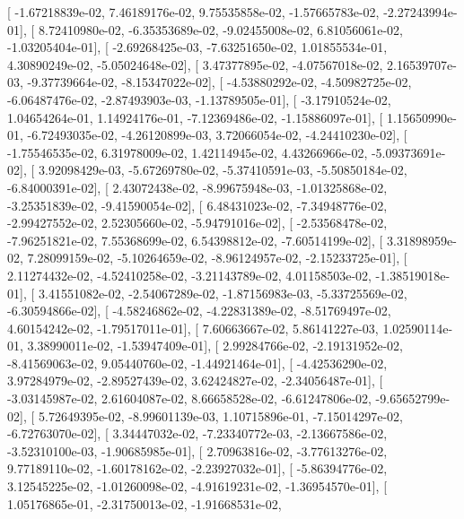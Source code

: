 \documentclass{article}
\begin{document}
       [ -1.67218839e-02,   7.46189176e-02,   9.75535858e-02,
         -1.57665783e-02,  -2.27243994e-01],
       [  8.72410980e-02,  -6.35353689e-02,  -9.02455008e-02,
          6.81056061e-02,  -1.03205404e-01],
       [ -2.69268425e-03,  -7.63251650e-02,   1.01855534e-01,
          4.30890249e-02,  -5.05024648e-02],
       [  3.47377895e-02,  -4.07567018e-02,   2.16539707e-03,
         -9.37739664e-02,  -8.15347022e-02],
       [ -4.53880292e-02,  -4.50982725e-02,  -6.06487476e-02,
         -2.87493903e-03,  -1.13789505e-01],
       [ -3.17910524e-02,   1.04654264e-01,   1.14924176e-01,
         -7.12369486e-02,  -1.15886097e-01],
       [  1.15650990e-01,  -6.72493035e-02,  -4.26120899e-03,
          3.72066054e-02,  -4.24410230e-02],
       [ -1.75546535e-02,   6.31978009e-02,   1.42114945e-02,
          4.43266966e-02,  -5.09373691e-02],
       [  3.92098429e-03,  -5.67269780e-02,  -5.37410591e-03,
         -5.50850184e-02,  -6.84000391e-02],
       [  2.43072438e-02,  -8.99675948e-03,  -1.01325868e-02,
         -3.25351839e-02,  -9.41590054e-02],
       [  6.48431023e-02,  -7.34948776e-02,  -2.99427552e-02,
          2.52305660e-02,  -5.94791016e-02],
       [ -2.53568478e-02,  -7.96251821e-02,   7.55368699e-02,
          6.54398812e-02,  -7.60514199e-02],
       [  3.31898959e-02,   7.28099159e-02,  -5.10264659e-02,
         -8.96124957e-02,  -2.15233725e-01],
       [  2.11274432e-02,  -4.52410258e-02,  -3.21143789e-02,
          4.01158503e-02,  -1.38519018e-01],
       [  3.41551082e-02,  -2.54067289e-02,  -1.87156983e-03,
         -5.33725569e-02,  -6.30594866e-02],
       [ -4.58246862e-02,  -4.22831389e-02,  -8.51769497e-02,
          4.60154242e-02,  -1.79517011e-01],
       [  7.60663667e-02,   5.86141227e-03,   1.02590114e-01,
          3.38990011e-02,  -1.53947409e-01],
       [  2.99284766e-02,  -2.19131952e-02,  -8.41569063e-02,
          9.05440760e-02,  -1.44921464e-01],
       [ -4.42536290e-02,   3.97284979e-02,  -2.89527439e-02,
          3.62424827e-02,  -2.34056487e-01],
       [ -3.03145987e-02,   2.61604087e-02,   8.66658528e-02,
         -6.61247806e-02,  -9.65652799e-02],
       [  5.72649395e-02,  -8.99601139e-03,   1.10715896e-01,
         -7.15014297e-02,  -6.72763070e-02],
       [  3.34447032e-02,  -7.23340772e-03,  -2.13667586e-02,
         -3.52310100e-03,  -1.90685985e-01],
       [  2.70963816e-02,  -3.77613276e-02,   9.77189110e-02,
         -1.60178162e-02,  -2.23927032e-01],
       [ -5.86394776e-02,   3.12545225e-02,  -1.01260098e-02,
         -4.91619231e-02,  -1.36954570e-01],
       [  1.05176865e-01,  -2.31750013e-02,  -1.91668531e-02,
\end{document}
